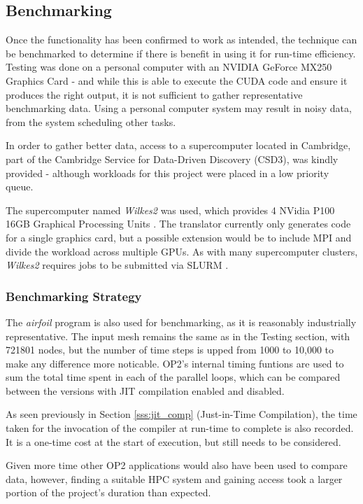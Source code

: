 
\subsection{Benchmarking}
Once the functionality has been confirmed to work as intended, the technique can be benchmarked to determine if there is benefit in using it for run-time efficiency. Testing was done on a personal computer with an NVIDIA GeForce MX250 Graphics Card \cite{mx250} - and while this is able to execute the CUDA code and ensure it produces the right output, it is not sufficient to gather representative benchmarking data. Using a personal computer system may result in noisy data, from the system scheduling other tasks.
\par
In order to gather better data, access to a supercomputer located in Cambridge, part of the Cambridge Service for Data-Driven Discovery (CSD3), was kindly provided - although workloads for this project were placed in a low priority queue.
\par
The supercomputer named \textit{Wilkes2} was used, which provides 4 NVidia P100 16GB Graphical Processing Units \cite{p100}. The translator currently only generates code for a single graphics card, but a possible extension would be to include MPI and divide the workload across multiple GPUs. As with many supercomputer clusters, \textit{Wilkes2} requires jobs to be submitted via SLURM \cite{slurm}.

\subsubsection{Benchmarking Strategy}
The \textit{airfoil} program is also used for benchmarking, as it is reasonably industrially representative. The input mesh remains the same as in the Testing section, with 721801 nodes, but the number of time steps is upped from 1000 to 10,000 to make any difference more noticable. OP2's internal timing funtions are used to sum the total time spent in each of the parallel loops, which can be compared between the versions with JIT compilation enabled and disabled.
\par
As seen previously in Section \ref{sss:jit_comp} (Just-in-Time Compilation), the time taken for the invocation of the compiler at run-time to complete is also recorded. It is a one-time cost at the start of execution, but still needs to be considered.
\par
Given more time other OP2 applications would also have been used to compare data, however, finding a suitable HPC system and gaining access took a larger portion of the project's duration than expected.

